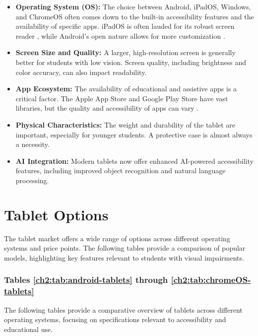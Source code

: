 \begin{itemize}
	\item \textbf{Operating System (OS):} The choice between Android, iPadOS, Windows, and ChromeOS often comes down to the built-in accessibility features and the availability of specific apps. iPadOS is often lauded for its robust  screen reader \supercite{AppleVoiceOver}, while Android's open nature allows for more customization \supercite{AndroidAccessibility, GoogleTalkBack}.
	\item \textbf{Screen Size and Quality:} A larger, high-resolution screen is generally better for students with low vision. Screen quality, including brightness and color accuracy, can also impact readability.\supercite{AFBiOS, AAOTechnologyTools}
	\item \textbf{App Ecosystem:} The availability of educational and assistive apps is a critical factor. The Apple App Store and Google Play Store have vast libraries, but the quality and accessibility of apps can vary \supercite{AAOApps}.
	\item \textbf{Physical Characteristics:} The weight and durability of the tablet are important, especially for younger students. A protective case is almost always a necessity.\supercite{Day2021}
	\item \textbf{AI Integration:} Modern tablets now offer enhanced AI-powered accessibility features, including improved object recognition and natural language processing.\supercite{HIMSReleaseNotes, Android16Release}
\end{itemize}

\section{Tablet Options}\label{ch2:sec:tablet-options}

The tablet market offers a wide range of options across different operating systems and price points. The following tables provide a comparison of popular models, highlighting key features relevant to students with visual impairments.

\subsubsection{Tables \ref{ch2:tab:android-tablets} through \ref{ch2:tab:chromeOS-tablets}}
The following tables provide a comparative overview of tablets across different operating systems, focusing on specifications relevant to \gls{accessibility} and educational use.

